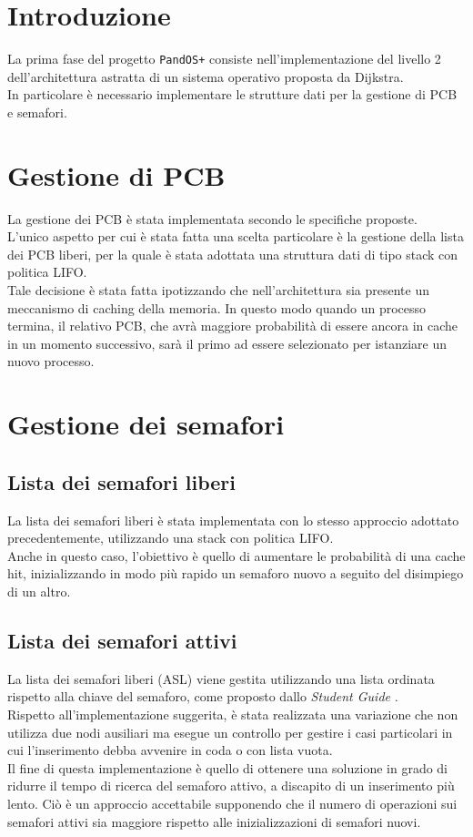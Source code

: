 \documentclass[11pt]{article}
\begin{document}
\newpage

\section{Introduzione}
La prima fase del progetto \texttt{PandOS+} consiste nell'implementazione del livello 2 dell'architettura astratta di un sistema operativo proposta da Dijkstra.\\
In particolare è necessario implementare le strutture dati per la gestione di PCB e semafori.

\section{Gestione di PCB}
La gestione dei PCB è stata implementata secondo le specifiche proposte. \\
L'unico aspetto per cui è stata fatta una scelta particolare è la gestione della lista dei PCB liberi, per la quale è stata adottata una struttura dati di tipo stack con politica LIFO.\\
Tale decisione è stata fatta ipotizzando che nell'architettura sia presente un meccanismo di caching della memoria. In questo modo quando un processo termina, 
il relativo PCB, che avrà maggiore probabilità di essere ancora in cache in un momento successivo, sarà il primo ad essere selezionato per istanziare un nuovo processo.

\section{Gestione dei semafori}
\subsection{Lista dei semafori liberi}
La lista dei semafori liberi è stata implementata con lo stesso approccio adottato precedentemente, utilizzando una stack con politica LIFO. \\
Anche in questo caso, l'obiettivo è quello di aumentare le probabilità di una cache hit, inizializzando in modo più rapido un semaforo nuovo a seguito del disimpiego di un altro.

\subsection{Lista dei semafori attivi}
La lista dei semafori liberi (ASL) viene gestita utilizzando una lista ordinata rispetto alla chiave del semaforo, come proposto dallo \textit{Student Guide} \cite{1}. \\
Rispetto all'implementazione suggerita, è stata realizzata una variazione che non utilizza due nodi ausiliari ma esegue un controllo per gestire i casi particolari in cui l'inserimento debba avvenire in coda o con lista vuota.\\
Il fine di questa implementazione è quello di ottenere una soluzione in grado di ridurre il tempo di ricerca del semaforo attivo, a discapito di un inserimento più lento.
Ciò è un approccio accettabile supponendo che il numero di operazioni sui semafori attivi sia maggiore rispetto alle inizializzazioni di semafori nuovi.

\newpage
\printbibliography[title={Bibliografia}]
\end{document}
